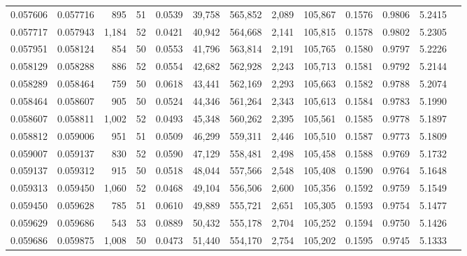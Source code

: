 \begin{tabular}{rrrrrrrrrrrrr}
0.057606 & 0.057716 &   895 &  51 &                                     0.0539 &  39,758 & 565,852 &   2,089 & 105,867 & 0.1576 & 0.9806 & 5.2415 \\
0.057717 & 0.057943 & 1,184 &  52 &                                     0.0421 &  40,942 & 564,668 &   2,141 & 105,815 & 0.1578 & 0.9802 & 5.2305 \\
0.057951 & 0.058124 &   854 &  50 &                                     0.0553 &  41,796 & 563,814 &   2,191 & 105,765 & 0.1580 & 0.9797 & 5.2226 \\
0.058129 & 0.058288 &   886 &  52 &                                     0.0554 &  42,682 & 562,928 &   2,243 & 105,713 & 0.1581 & 0.9792 & 5.2144 \\
0.058289 & 0.058464 &   759 &  50 &                                     0.0618 &  43,441 & 562,169 &   2,293 & 105,663 & 0.1582 & 0.9788 & 5.2074 \\
0.058464 & 0.058607 &   905 &  50 &                                     0.0524 &  44,346 & 561,264 &   2,343 & 105,613 & 0.1584 & 0.9783 & 5.1990 \\
0.058607 & 0.058811 & 1,002 &  52 &                                     0.0493 &  45,348 & 560,262 &   2,395 & 105,561 & 0.1585 & 0.9778 & 5.1897 \\
0.058812 & 0.059006 &   951 &  51 &                                     0.0509 &  46,299 & 559,311 &   2,446 & 105,510 & 0.1587 & 0.9773 & 5.1809 \\
0.059007 & 0.059137 &   830 &  52 &                                     0.0590 &  47,129 & 558,481 &   2,498 & 105,458 & 0.1588 & 0.9769 & 5.1732 \\
0.059137 & 0.059312 &   915 &  50 &                                     0.0518 &  48,044 & 557,566 &   2,548 & 105,408 & 0.1590 & 0.9764 & 5.1648 \\
0.059313 & 0.059450 & 1,060 &  52 &                                     0.0468 &  49,104 & 556,506 &   2,600 & 105,356 & 0.1592 & 0.9759 & 5.1549 \\
0.059450 & 0.059628 &   785 &  51 &                                     0.0610 &  49,889 & 555,721 &   2,651 & 105,305 & 0.1593 & 0.9754 & 5.1477 \\
0.059629 & 0.059686 &   543 &  53 &                                     0.0889 &  50,432 & 555,178 &   2,704 & 105,252 & 0.1594 & 0.9750 & 5.1426 \\
0.059686 & 0.059875 & 1,008 &  50 &                                     0.0473 &  51,440 & 554,170 &   2,754 & 105,202 & 0.1595 & 0.9745 & 5.1333 \\

\end{tabular}
